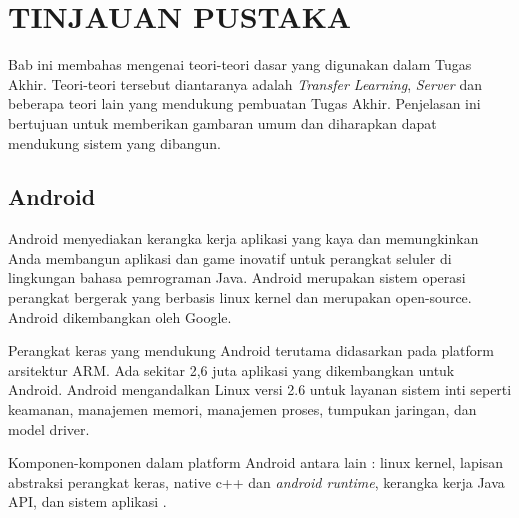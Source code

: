\chapter {TINJAUAN PUSTAKA}
Bab ini membahas mengenai teori-teori dasar yang digunakan dalam Tugas Akhir. Teori-teori tersebut diantaranya adalah \textit{Transfer Learning}, \textit{Server} dan beberapa teori lain yang mendukung pembuatan Tugas Akhir. Penjelasan ini bertujuan untuk memberikan gambaran umum dan diharapkan dapat mendukung sistem yang dibangun.

\section{Android}
Android menyediakan kerangka kerja aplikasi yang kaya dan memungkinkan Anda membangun aplikasi dan game inovatif untuk perangkat seluler di lingkungan bahasa pemrograman Java.   Android merupakan sistem operasi perangkat bergerak yang berbasis linux kernel dan merupakan open-source. Android dikembangkan oleh Google.

\par Perangkat keras yang mendukung Android terutama didasarkan pada platform arsitektur ARM. Ada sekitar 2,6 juta aplikasi yang dikembangkan untuk Android. Android mengandalkan Linux versi 2.6 untuk layanan sistem inti seperti keamanan, manajemen memori, manajemen proses, tumpukan jaringan, dan model driver. 

\par Komponen-komponen dalam platform Android antara lain : linux kernel, lapisan abstraksi perangkat keras, native c++ dan \textit{android runtime}, kerangka kerja Java API, dan sistem aplikasi \cite{android_def}.


